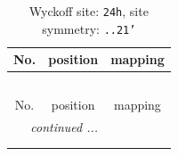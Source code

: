 \documentclass[fleqn,8pt]{jsarticle}
\begin{document}
\renewcommand{\arraystretch}{1.2}
\begin{longtable}{ccc}
\caption{Wyckoff site: {\tt 24h}, site symmetry: {\tt ..21'}}
 \\
 \hline \hline
No. & position & mapping \\ \hline \endfirsthead

\multicolumn{2}{l}{\tablename\ \thetable{}} \\
 \hline \hline
No. & position & mapping \\ \hline \endhead

 \hline \hline
\multicolumn{2}{r}{\footnotesize\it continued ...} \\ \endfoot

 \hline \hline
\multicolumn{2}{r}{} \\ \endlastfoot


\end{longtable}
\end{document}
